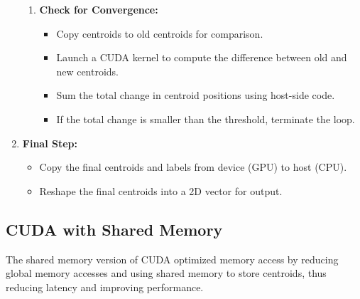 \documentclass[letterpaper,12pt]{article}
\theoremstyle{remark}
\begin{document}
\begin{enumerate}
\begin{enumerate}
        \item \textbf{Check for Convergence:}
        \begin{itemize}
            \item Copy centroids to old centroids for comparison.
            \item Launch a CUDA kernel to compute the difference between old and new centroids.
            \item Sum the total change in centroid positions using host-side code.
            \item If the total change is smaller than the threshold, terminate the loop.
        \end{itemize}
    \end{enumerate}
    
    \item \textbf{Final Step:}
    \begin{itemize}
        \item Copy the final centroids and labels from device (GPU) to host (CPU).
        \item Reshape the final centroids into a 2D vector for output.
    \end{itemize}
\end{enumerate}











\subsection{CUDA with Shared Memory}
The shared memory version of CUDA optimized memory access by reducing global memory accesses and using shared memory to store centroids, thus reducing latency and improving performance.
\end{document}
